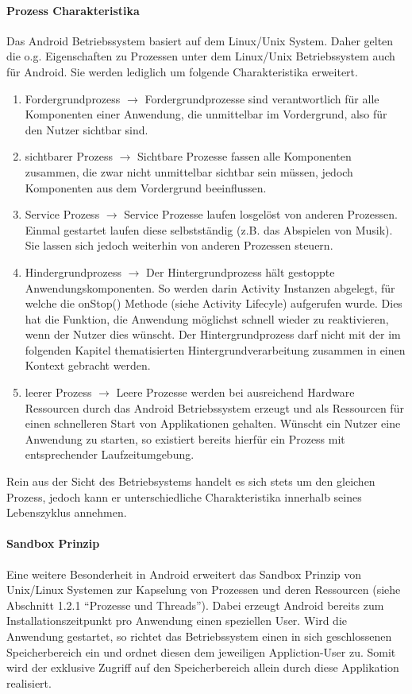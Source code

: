 \documentclass[12pt,oneside,a4paper,bibtotoc,liststotoc]{scrreprt}
\begin{document}
\paragraph{Prozess Charakteristika}
Das Android Betriebssystem basiert auf dem Linux/Unix System. Daher gelten die o.g. Eigenschaften zu Prozessen unter dem Linux/Unix Betriebssystem auch für Android. Sie werden lediglich um folgende Charakteristika erweitert.
\begin{enumerate}
\item Fordergrundprozess $\rightarrow$ Fordergrundprozesse sind verantwortlich für alle Komponenten einer Anwendung, die unmittelbar im Vordergrund, also für den Nutzer sichtbar sind.
\item sichtbarer Prozess $\rightarrow$ Sichtbare Prozesse fassen alle Komponenten zusammen, die zwar nicht unmittelbar sichtbar sein müssen, jedoch Komponenten aus dem Vordergrund beeinflussen.
\item Service Prozess $\rightarrow$  Service Prozesse laufen losgelöst von anderen Prozessen. Einmal gestartet laufen diese selbstständig (z.B. das Abspielen von Musik). Sie lassen sich jedoch weiterhin von anderen Prozessen steuern.
\item Hindergrundprozess $\rightarrow$ Der Hintergrundprozess hält gestoppte Anwendungskomponenten. So werden darin Activity Instanzen abgelegt, für welche die onStop() Methode (siehe Activity Lifecyle) aufgerufen wurde. Dies hat die Funktion, die Anwendung möglichst schnell wieder zu reaktivieren, wenn der Nutzer dies wünscht. Der Hintergrundprozess darf nicht mit der im folgenden Kapitel thematisierten Hintergrundverarbeitung zusammen in einen Kontext gebracht werden.
\item leerer Prozess $\rightarrow$ Leere Prozesse werden bei ausreichend Hardware Ressourcen durch das Android Betriebssystem erzeugt und als Ressourcen für einen schnelleren Start von Applikationen gehalten. Wünscht ein Nutzer eine Anwendung zu starten, so existiert bereits hierfür ein Prozess mit entsprechender Laufzeitumgebung.
\end{enumerate}
Rein aus der Sicht des Betriebsystems handelt es sich stets um den gleichen Prozess, jedoch kann er unterschiedliche Charakteristika innerhalb seines Lebenszyklus annehmen.
\paragraph{Sandbox Prinzip}
Eine weitere Besonderheit in Android erweitert das Sandbox Prinzip von Unix/Linux Systemen zur Kapselung von Prozessen und deren Ressourcen (siehe Abschnitt 1.2.1 “Prozesse und Threads”). Dabei erzeugt Android bereits zum Installationszeitpunkt pro Anwendung einen speziellen User. Wird die Anwendung gestartet, so richtet das Betriebssystem einen in sich geschlossenen Speicherbereich ein und ordnet diesen dem jeweiligen Appliction-User zu. Somit wird der exklusive Zugriff auf den Speicherbereich allein durch diese Applikation realisiert.
\end{document}
